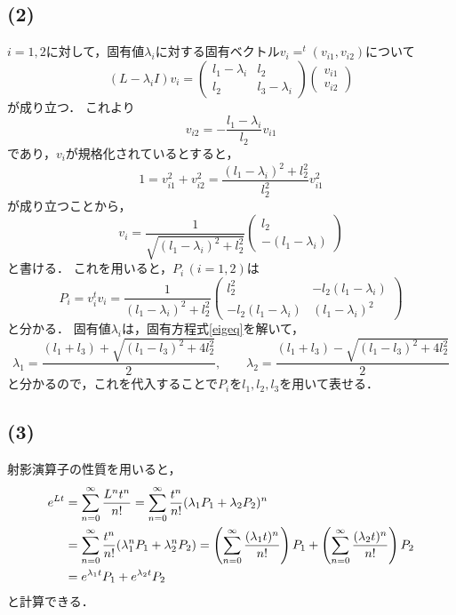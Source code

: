 \documentclass[a4paper,11pt]{jsarticle}
\begin{document}
\subsection*{(2)}
$i=1,2$に対して，固有値$\lambda_i$に対する固有ベクトル$v_i= ^t(v_{i1},v_{i2})$について
\begin{equation}
  (L-\lambda_i I)v_i = \left(
    \begin{matrix}
      l_1 - \lambda_i & l_2 \\
      l_2 & l_3 - \lambda_i
    \end{matrix}
  \right)
  \left(
    \begin{matrix}
      v_{i1} \\
      v_{i2}
    \end{matrix}
  \right)
\end{equation}
が成り立つ．
これより
\begin{equation}
  v_{i2} = - \frac{l_1-\lambda_i}{l_2} v_{i1}
\end{equation}
であり，$v_i$が規格化されているとすると，
\begin{equation}
  1 = v_{i1}^2 + v_{i2}^2 = \frac{(l_1-\lambda_i)^2+l_2^2}{l_2^2} v_{i1}^2
\end{equation}
が成り立つことから，
\begin{equation}
  v_i = \frac{1}{\sqrt{(l_1-\lambda_i)^2+l_2^2}}
  \left(
  \begin{matrix}
    l_2 \\
    -(l_1-\lambda_i)
  \end{matrix}
  \right)
\end{equation}
と書ける．
これを用いると，$P_i\,(i=1,2)$は
\begin{equation}
  P_i = v_i ^t v_i = \frac{1}{(l_1-\lambda_i)^2+l_2^2}
  \left(
  \begin{matrix}
    l_2^2 & -l_2(l_1-\lambda_i) \\
    -l_2(l_1-\lambda_i) & (l_1-\lambda_i)^2
  \end{matrix}
  \right)
\end{equation}
と分かる．
固有値$\lambda_i$は，固有方程式\eqref{eigeq}を解いて，
\begin{equation}
  \lambda_1 = \frac{(l_1+l_3)+\sqrt{(l_1-l_3)^2+4l_2^2}}{2},\qquad \lambda_2 = \frac{(l_1+l_3)-\sqrt{(l_1-l_3)^2+4l_2^2}}{2}
\end{equation}
と分かるので，これを代入することで$P_i$を$l_1,l_2,l_3$を用いて表せる．

\subsection*{(3)}
射影演算子の性質を用いると，
\begin{align}
  e^{Lt} &= \sum_{n=0}^{\infty} \frac{L^nt^n}{n!} 
  = \sum_{n=0}^{\infty} \frac{t^n}{n!}(\lambda_1 P_1 + \lambda_2 P_2)^n \notag\\
  &= \sum_{n=0}^{\infty} \frac{t^n}{n!} (\lambda_1^n P_1 + \lambda_2^n P_2) 
  = \left(\sum_{n=0}^{\infty} \frac{(\lambda_1t)^n}{n!}\right)P_1 + \left(\sum_{n=0}^{\infty} \frac{(\lambda_2t)^n}{n!}\right)P_2 \notag\\
  &= e^{\lambda_1t}P_1 + e^{\lambda_2t}P_2 
\end{align}
と計算できる．
\end{document}

